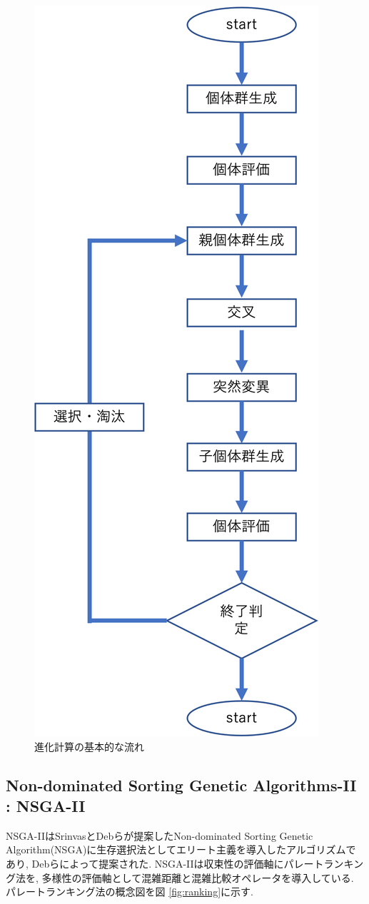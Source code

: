 \documentclass[11pt,a4j,notitlepage]{jreport}
\begin{document}
\begin{figure}[htbp]
	\begin{center}
		\includegraphics[width=0.55\linewidth]{fig2.png}
             		\setlength{\abovecaptionskip}{0mm}
		\setlength{\belowcaptionskip}{0mm}
			\caption{進化計算の基本的な流れ}
	\label{fig:GA}
	\end{center}
\end{figure}
\newpage

\subsection{Non-dominated Sorting Genetic Algorithms-II : NSGA-II}
NSGA-II\cite{Deb}はSrinvasとDebらが提案したNon-dominated Sorting Genetic Algorithm(NSGA)に生存選択法としてエリート主義を導入したアルゴリズムであり, Debらによって提案された.
NSGA-IIは収束性の評価軸にパレートランキング法を, 多様性の評価軸として混雑距離と混雑比較オペレータを導入している.
パレートランキング法の概念図を図 \ref{fig:ranking}に示す.
\end{document}
